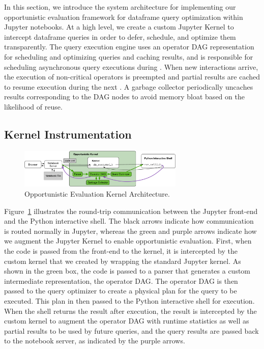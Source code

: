 In this section, we introduce the system architecture for implementing our
opportunistic evaluation framework for dataframe query optimization within Jupyter notebooks. 
At a high level, we create a custom Jupyter Kernel to intercept dataframe queries in order to defer, schedule, and optimize them transparently. The query execution engine uses an operator DAG representation for scheduling and optimizing queries and caching results, and is responsible for scheduling asynchronous query executions during \thinktime. When new interactions arrive, the execution of non-critical operators is preempted and partial results are cached to resume execution during the next \thinktime. A garbage collector periodically uncaches results corresponding to the DAG nodes to avoid memory bloat based on the likelihood of reuse.


\subsection{Kernel Instrumentation}
\begin{figure}
    \centering
    \includegraphics[width=0.7\textwidth]{submissions/interactivity/figures/kernel.pdf}
    \caption{Opportunistic Evaluation Kernel Architecture.}
    \label{fig:workflow}
    \vspace{-5mm}
\end{figure}

Figure~\ref{fig:workflow} illustrates the round-trip communication between the Jupyter front-end and the Python interactive shell. The black arrows indicate how communication is routed normally in Jupyter, whereas the green and purple arrows indicate how we augment the Jupyter Kernel to enable opportunistic evaluation. First, when the code is passed from the front-end to the kernel, it is intercepted by the custom kernel that we created by wrapping the standard Jupyter kernel. As shown in the green box, the code is passed to a parser that generates a custom intermediate representation, the operator DAG. The operator DAG is then passed to the query optimizer to create a physical plan for the query to be executed. This plan in then passed to the Python interactive shell for execution. When the shell returns the result after execution, the result is intercepted by the custom kernel to augment the operator DAG with runtime statistics as well as partial results to be used by future queries, and the query results are passed back to the notebook server, as indicated by the purple arrows.

